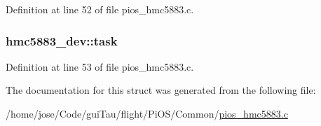Definition at line 52 of file pios\-\_\-hmc5883.\-c.

\hypertarget{structhmc5883__dev_a1e212c4df92f634246a79adcba32a4cf}{
\subsubsection[{task}]{ hmc5883\-\_\-dev\-::task}}\label{structhmc5883__dev_a1e212c4df92f634246a79adcba32a4cf}


Definition at line 53 of file pios\-\_\-hmc5883.\-c.



The documentation for this struct was generated from the following file\-:\begin{DoxyCompactItemize}
\item 
/home/jose/\-Code/gui\-Tau/flight/\-Pi\-O\-S/\-Common/\hyperlink{pios__hmc5883_8c}{pios\-\_\-hmc5883.\-c}\end{DoxyCompactItemize}
